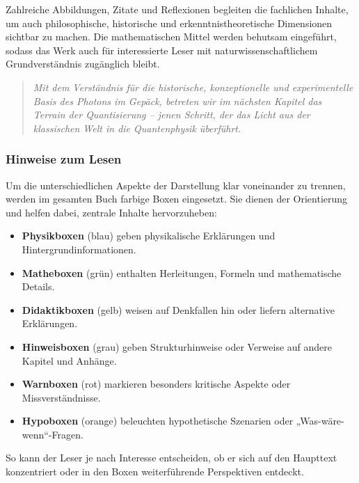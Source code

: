 Zahlreiche Abbildungen, Zitate und Reflexionen begleiten die fachlichen Inhalte, um auch philosophische, historische und erkenntnistheoretische Dimensionen sichtbar zu machen. Die mathematischen Mittel werden behutsam eingeführt, sodass das Werk auch für interessierte Leser mit naturwissenschaftlichem Grundverständnis zugänglich bleibt.

\begin{quote}
	\textit{Mit dem Verständnis für die historische, konzeptionelle und experimentelle Basis des Photons im Gepäck, betreten wir im nächsten Kapitel das Terrain der Quantisierung – jenen Schritt, der das Licht aus der klassischen Welt in die Quantenphysik überführt.}
\end{quote}

\subsubsection*{Hinweise zum Lesen}
Um die unterschiedlichen Aspekte der Darstellung klar voneinander zu trennen,
werden im gesamten Buch farbige Boxen eingesetzt. Sie dienen der Orientierung
und helfen dabei, zentrale Inhalte hervorzuheben:

\begin{itemize}
	\item \textbf{Physikboxen} (blau) geben physikalische Erklärungen und
	Hintergrundinformationen.
	\item \textbf{Matheboxen} (grün) enthalten Herleitungen, Formeln und
	mathematische Details.
	\item \textbf{Didaktikboxen} (gelb) weisen auf Denkfallen hin oder liefern
	alternative Erklärungen.
	\item \textbf{Hinweisboxen} (grau) geben Strukturhinweise oder Verweise auf
	andere Kapitel und Anhänge.
	\item \textbf{Warnboxen} (rot) markieren besonders kritische Aspekte oder
	Missverständnisse.
	\item \textbf{Hypoboxen} (orange) beleuchten hypothetische Szenarien oder
	„Was-wäre-wenn“-Fragen.
\end{itemize}

So kann der Leser je nach Interesse entscheiden, ob er sich auf den
Haupttext konzentriert oder in den Boxen weiterführende Perspektiven entdeckt.


